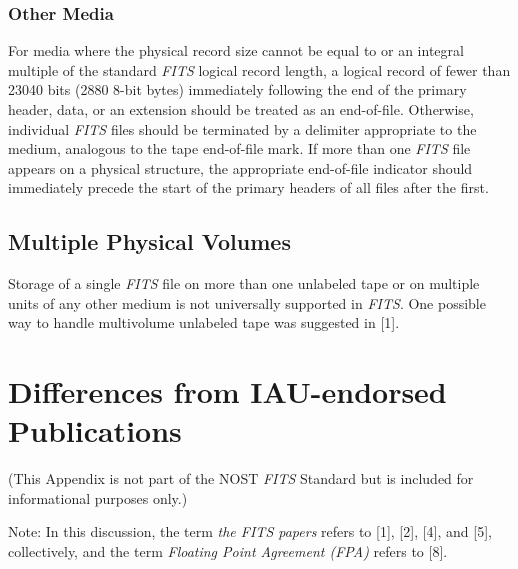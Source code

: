   \subsection{Other Media}
   For media where the physical record size cannot be equal to or
   an integral multiple of the standard {\em FITS\/} logical record length, 
   a logical record of fewer than 23040 bits (2880 8-bit bytes) immediately
   following the end of the primary header, 
   data, or an extension
   should be treated as an end-of-file. Otherwise, individual 
   {\em FITS\/} files should be terminated by a delimiter appropriate 
   to the medium, analogous to the tape end-of-file mark.  
   If more than one {\em FITS\/} file appears on a 
   physical structure, the appropriate end-of-file indicator 
   should immediately precede the start of the primary
   headers of all files after the first.  
  
\section{Multiple Physical Volumes}
   Storage of a single {\em FITS\/} file on more than one unlabeled tape 
   or on multiple units of any other medium is not universally supported
   in {\em FITS}.  One possible way to handle multivolume 
   unlabeled tape was suggested in [1]. 

\chapter{Differences from IAU-endorsed Publications}
\label{s:sdif}
   (This Appendix is not part of the NOST {\em FITS\/} Standard but 
   is included for informational purposes only.)       

Note: In this discussion, the term {\em the FITS papers} 
      refers to [1], [2], 
     [4], and [5], collectively, and the term {\em Floating Point Agreement
     (FPA)} refers to [8].

